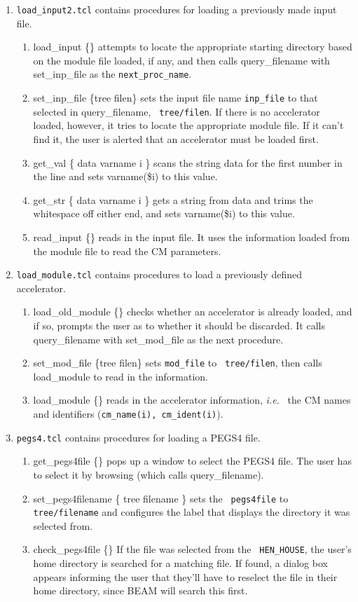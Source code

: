 \documentclass[12pt]{book}
\newcommand{\ie}{{\em i.e.}}
\begin{document}
\begin{enumerate}
\item {\tt load\_input2.tcl} contains procedures for loading a previously made
input file.
\begin{enumerate}
\item {\sf load\_input \{\}} attempts to locate the appropriate starting
directory based on the module file loaded, if any, and then calls {\sf
query\_filename} with {\sf set\_inp\_file} as the {\tt next\_proc\_name}.
\item {\sf set\_inp\_file \{tree filen\}} sets the input file name
{\tt inp\_file} to that selected in {\sf query\_filename}, {\tt
tree/filen}.  If there
is no accelerator loaded, however, it tries to locate the appropriate
module file.  If it can't find it, the user is alerted that an
accelerator must be loaded first.
\item {\sf get\_val \{ data varname i \}} scans the string data for the
first number in the line and sets varname(\$i) to this value.
\item {\sf get\_str \{ data varname i \}} gets a string from data and
trims the whitespace off either end, and sets varname(\$i) to this value.
\item {\sf read\_input \{\}} reads in the input file.  It uses the
information loaded from the module file to read the CM parameters.
\end{enumerate}

\item {\tt load\_module.tcl} contains procedures to load a previously defined
accelerator.
\begin{enumerate}
\item {\sf load\_old\_module \{\}} checks whether an accelerator is already
loaded, and if so, prompts the user as to whether it should be
discarded.  It calls {\sf query\_filename} with {\sf set\_mod\_file} as the next
procedure.
\item {\sf set\_mod\_file \{tree filen\}} sets {\tt mod\_file} to {\tt
tree/filen}, then calls {\sf load\_module} to read in the information.
\item {\sf load\_module \{\}} reads in the accelerator information, \ie~
the CM names and identifiers ({\tt cm\_name(i), cm\_ident(i)}).
\end{enumerate}

\item {\tt pegs4.tcl} contains procedures for loading a PEGS4 file.
\begin{enumerate}
\item {\sf get\_pegs4file \{\}} pops up a window to select the PEGS4
file.  The user has to select it by browsing (which calls {\sf
query\_filename}).
\item {\sf set\_pegs4filename \{ tree filename \}} sets the {\tt
pegs4file} to {\tt tree/filename} and configures the label that displays
the directory it was selected from.
\item {\sf check\_pegs4file \{\}} If the file was selected from the {\tt
HEN\_HOUSE}, the user's home directory is searched for a matching
file.  If found, a dialog box appears informing the user that they'll
have to reselect the file in their home directory, since BEAM will
search this first.
\end{enumerate}


\end{enumerate}
\end{document}

